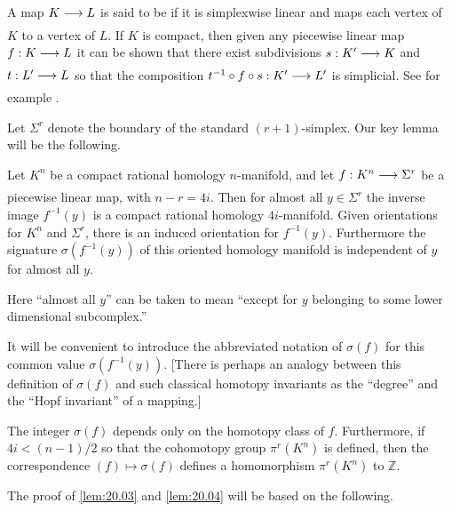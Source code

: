 \documentclass[../main]{subfiles}
\begin{document}
A map $K\varrightarrow{} L$ is said to be  if it is simplexwise linear and maps each vertex of $K$ to a vertex of $L$. If $K$ is compact, then given any piecewise linear map $f:K \varrightarrow{} L$ it can be shown that there exist subdivisions $s:K' \varrightarrow{} K$ and $t:L' \varrightarrow{} L$ so that the composition $t^{-1} \circ f \circ s:K' \varrightarrow{} L'$ is simplicial. See for example \cite[p. 17]{rourke2012introduction}.

Let $\Sigma^r$ denote the boundary of the standard $(r+1)$-simplex. Our key lemma will be the following.

\begin{lemma}
\label{lem:20.03}
Let $K^n$ be a compact rational homology $n$-manifold, and let $f:K^n \varrightarrow{} \Sigma^r$ be a piecewise linear map, with $n-r=4i$. Then for almost all $y \in \Sigma^r$ the inverse image $f^{-1}(y)$ is a compact rational homology $4i$-manifold. Given orientations for $K^n$ and $\Sigma^r$, there is an induced orientation for $f^{-1}(y)$. Furthermore the signature $\sigma(f^{-1}(y))$ of this oriented homology manifold is independent of $y$ for almost all $y$.
\end{lemma}
Here ``almost all $y$'' can be taken to mean ``except for $y$ belonging to some lower dimensional subcomplex.''

It will be convenient to introduce the abbreviated notation of $\sigma(f)$ for this common value $\sigma(f^{-1}(y))$. [There is perhaps an analogy between this definition of $\sigma(f)$ and such classical homotopy invariants as the ``degree'' and the ``Hopf invariant'' of a mapping.]

\begin{lemma}
\label{lem:20.04}
The integer $\sigma(f)$ depends only on the homotopy class of $f$. Furthermore, if $4i < (n-1)/2$ so that the cohomotopy group $\pi^r(K^n)$ is defined, then the correspondence $(f) \mapsto \sigma(f)$ defines a homomorphism $\pi^r(K^n)$ to $\mathbb{Z}$.
\end{lemma}
The proof of \ref{lem:20.03} and \ref{lem:20.04} will be based on the following.
\end{document}

